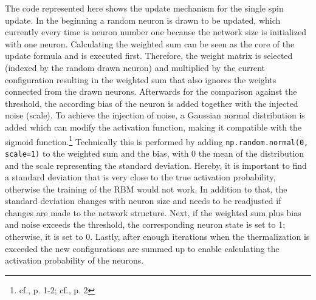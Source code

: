 The code represented here shows the update mechanism for the single spin update. 
In the beginning a random neuron is drawn to be updated, which currently every time is neuron number one because the network size is initialized with one neuron. 
Calculating the weighted sum can be seen as the core of the update formula and is executed first.
Therefore, the weight matrix is selected (indexed by the random drawn neuron) and multiplied by the current configuration resulting in 
the weighted sum that also ignores the weights connected from the drawn neurons.
Afterwards for the comparison against the threshold, the according bias of the neuron is added together with the injected noise (scale).
To achieve the injection of noise, a Gaussian normal distribution is added which can modify the activation function, making it compatible with the sigmoid function.\footnote{cf.\cite{bohmNoiseinjectedAnalogIsing2022}, p. 1-2; cf.\cite{mahmoodiVersatileStochasticDot2019}, p. 2}
Technically this is performed by adding \texttt{np.random.normal(0, scale=1)} to the weighted sum and the bias, with 0  the mean of the distribution and the scale representing the standard deviation. 
Hereby, it is important to find a standard deviation that is very close to the true activation probability, otherwise the training of the RBM would not work.
In addition to that, the standard deviation changes with neuron size and needs to be readjusted if changes are made to the network structure.
Next, if the weighted sum plus bias and noise exceeds the threshold, the corresponding neuron state is set to 1; otherwise, it is set to 0.
Lastly, after enough iterations when the thermalization is exceeded the new configurations
are summed up to enable calculating the activation probability of the neurons. 

